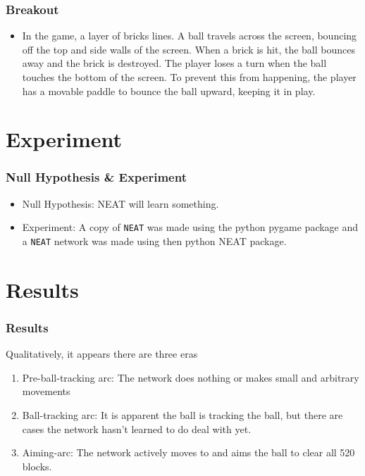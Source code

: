 \documentclass[t,pdflatex]{beamer}
\begin{document}
        \begin{frame}

        \frametitle{Breakout}
        \begin{itemize}
            \item In the game, a layer of bricks lines. A ball travels across the screen, bouncing off the top and side walls of the screen. When a brick is hit, the ball bounces away and the brick is destroyed. The player loses a turn when the ball touches the bottom of the screen. To prevent this from happening, the player has a movable paddle to bounce the ball upward, keeping it in play.
        \end{itemize}


    \end{frame}

\section{Experiment}

    \begin{frame}

        \frametitle{Null Hypothesis & Experiment}
        \begin{itemize}
            \item Null Hypothesis: NEAT will learn something.
            \item Experiment: A copy of \texttt{NEAT} was made using the python pygame package and a \texttt{NEAT} network was made using then python NEAT package.

        \end{itemize}

    \end{frame}

\section{Results}

    \begin{frame}

        \frametitle{Results}
        Qualitatively, it appears there are three eras
        \begin{enumerate}
            \item Pre-ball-tracking arc: The network does nothing or makes small and arbitrary movements
            \item Ball-tracking arc: It is apparent the ball is tracking the ball, but there are cases the network hasn't learned to do deal with yet.
            \item Aiming-arc: The network actively moves to and aims the ball to clear all 520 blocks.
        \end{enumerate}

    \end{frame}
\end{document}
